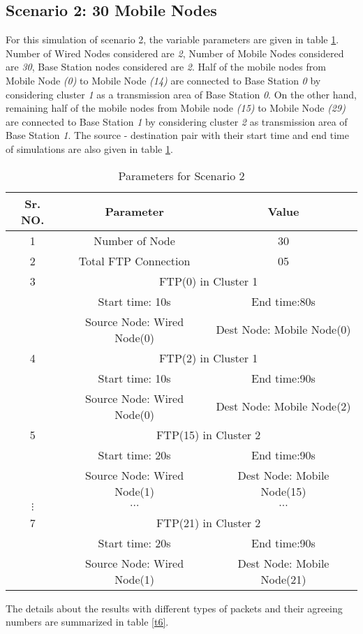 \documentclass[3p,times]{elsarticle}
\begin{document}
\subsection{Scenario 2: 30 Mobile Nodes}
For this simulation of scenario 2, the variable parameters are given in table \ref {t5}. Number of Wired Nodes considered are \emph{2}, Number of Mobile Nodes considered are \emph{30}, Base Station nodes considered are \emph{2}. Half of the mobile nodes from Mobile Node \emph{(0)} to Mobile Node \emph{(14)} are connected to Base Station \emph{0} by considering cluster \emph{1} as a transmission area of Base Station \emph{0}. On the other hand, remaining half of the mobile nodes from Mobile node \emph{(15)} to Mobile Node \emph{(29)} are connected to  Base Station \emph{1} by considering cluster \emph{2} as transmission area of Base Station \emph{1}. The source - destination pair with their start time and end time of simulations are also given in table \ref {t5}.
\begin{table}[t]
\centering
\caption{Parameters for Scenario 2}
\begin{tabular}{|c|c|c|}
\hline
Sr. NO. & Parameter & Value \\
\hline
1 & Number of Node & 30 \\
2& Total FTP Connection & 05 \\
\hline
3 & \multicolumn{2}{|c|}{ FTP(0) in Cluster 1} \\
 & Start time: 10s &  End time:80s\\
 & Source Node: Wired Node(0) & Dest Node: Mobile Node(0) \\
\hline
4 & \multicolumn{2}{|c|}{ FTP(2) in Cluster 1} \\
 & Start time: 10s &  End time:90s\\
 & Source Node: Wired Node(0) & Dest Node: Mobile Node(2) \\
\hline
5 & \multicolumn{2}{|c|}{ FTP(15) in Cluster 2} \\
 & Start time: 20s &  End time:90s\\
 & Source Node: Wired Node(1) & Dest Node: Mobile Node(15) \\
\hline
$ \vdots $ & $ \cdots $ & $ \cdots $ \\
\hline
7 & \multicolumn{2}{|c|}{ FTP(21) in Cluster 2} \\
 & Start time: 20s &  End time:90s\\
 & Source Node: Wired Node(1) & Dest Node: Mobile Node(21) \\
\hline
\end{tabular}
\label{t5}
\end{table}
The details about the results with different types of packets and their agreeing numbers are summarized in table \ref {t6}.
\end{document}
